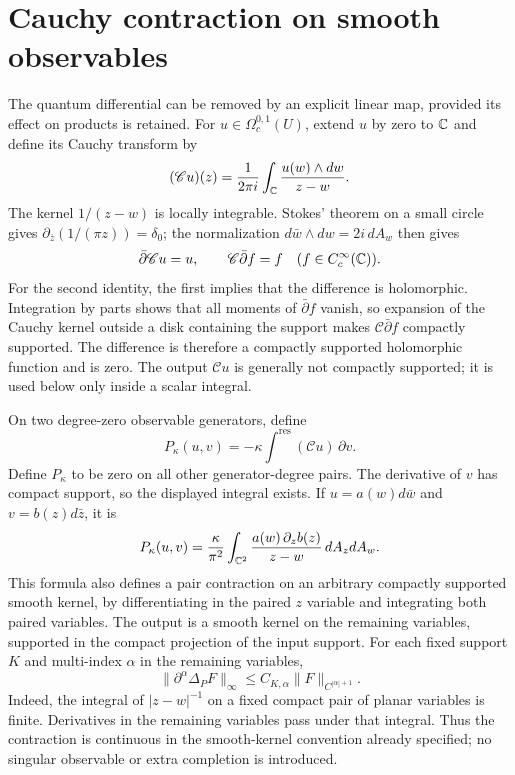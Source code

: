 \section{Cauchy contraction on smooth observables}

The quantum differential can be removed by an explicit linear map,
provided its effect on products is retained.  For
$u\in\Omega_c^{0,1}(U)$, extend $u$ by zero to $\mathbb C$ and define its
Cauchy transform by
\[
 (\mathscr C u)(z)=\frac1{2\pi i}\int_{\mathbb C}
                       \frac{u(w)\wedge dw}{z-w}.
\]
The kernel $1/(z-w)$ is locally integrable.  Stokes' theorem on a
small circle gives
$\partial_{\bar z}(1/(\pi z))=\delta_0$; the normalization
$d\bar w\wedge dw=2i\,dA_w$ then gives
\[
 \bar\partial\mathscr C u=u,\qquad
 \mathscr C\bar\partial f=f\quad(f\in C_c^\infty(\mathbb C)).
\]
For the second identity, the first implies that the difference is
holomorphic.  Integration by parts shows that all moments of
$\bar\partial f$ vanish, so expansion of the Cauchy kernel outside
a disk containing the support makes $\mathscr C\bar\partial f$ compactly supported.
The difference is therefore a compactly supported holomorphic
function and is zero.  The output $\mathscr C u$ is generally not
compactly supported; it is used below only inside a scalar integral.

On two degree-zero observable generators, define
\[
 P_\kappa(u,v)=-\kappa\int^{\mathrm{res}}
                             (\mathscr C u)\,\partial v.
\]
Define $P_\kappa$ to be zero on all other generator-degree pairs.
The derivative of $v$ has compact support, so the displayed integral
exists.  If $u=a(w)d\bar w$ and $v=b(z)d\bar z$, it is
\[
 P_\kappa(u,v)=\frac{\kappa}{\pi^2}
     \int_{\mathbb C^2}\frac{a(w)\,\partial_z b(z)}{z-w}\,dA_zdA_w.
\]
This formula also defines a pair contraction on an arbitrary compactly
supported smooth kernel, by differentiating in the paired $z$
variable and integrating both paired variables.  The output is a
smooth kernel on the remaining variables, supported in the compact
projection of the input support.  For each fixed support $K$ and
multi-index $\alpha$ in the remaining variables,
\[
 \|\partial^\alpha\Delta_P F\|_\infty
       \le C_{K,\alpha}\|F\|_{C^{|\alpha|+1}}.
\]
Indeed, the integral of $|z-w|^{-1}$ on a fixed compact pair of planar
variables is finite.  Derivatives in the remaining variables pass
under that integral.  Thus the contraction is continuous in the
smooth-kernel convention already specified; no singular observable
or extra completion is introduced.

